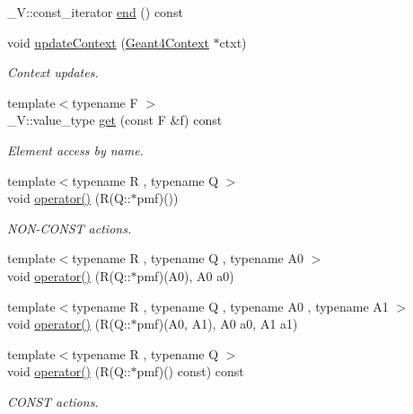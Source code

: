 \begin{DoxyCompactItemize}
\item 
\+\_\+\+V\+::const\+\_\+iterator \hyperlink{class_d_d4hep_1_1_simulation_1_1_geant4_action_1_1_actors_ad19506200e952a7953b94c1d2149f49f}{end} () const
\item 
void \hyperlink{class_d_d4hep_1_1_simulation_1_1_geant4_action_1_1_actors_aadb2c770ac471bc278d2fc9a1cc719d3}{update\+Context} (\hyperlink{class_d_d4hep_1_1_simulation_1_1_geant4_context}{Geant4\+Context} $\ast$ctxt)
\begin{DoxyCompactList}\small\item\em Context updates. \end{DoxyCompactList}\item 
{\footnotesize template$<$typename F $>$ }\\\+\_\+\+V\+::value\+\_\+type \hyperlink{class_d_d4hep_1_1_simulation_1_1_geant4_action_1_1_actors_addafc08601d080959bc0c93bc3318e1a}{get} (const F \&f) const
\begin{DoxyCompactList}\small\item\em Element access by name. \end{DoxyCompactList}\item 
{\footnotesize template$<$typename R , typename Q $>$ }\\void \hyperlink{class_d_d4hep_1_1_simulation_1_1_geant4_action_1_1_actors_aa8cac14e649580acf65f8a1c0392e6e3}{operator()} (R(Q\+::$\ast$pmf)())
\begin{DoxyCompactList}\small\item\em N\+O\+N-\/\+C\+O\+N\+ST actions. \end{DoxyCompactList}\item 
{\footnotesize template$<$typename R , typename Q , typename A0 $>$ }\\void \hyperlink{class_d_d4hep_1_1_simulation_1_1_geant4_action_1_1_actors_a8633bd70a1557d0e6791f2be4a5680e4}{operator()} (R(Q\+::$\ast$pmf)(A0), A0 a0)
\item 
{\footnotesize template$<$typename R , typename Q , typename A0 , typename A1 $>$ }\\void \hyperlink{class_d_d4hep_1_1_simulation_1_1_geant4_action_1_1_actors_a173fec5bb570e095bee2001ef38909b1}{operator()} (R(Q\+::$\ast$pmf)(A0, A1), A0 a0, A1 a1)
\item 
{\footnotesize template$<$typename R , typename Q $>$ }\\void \hyperlink{class_d_d4hep_1_1_simulation_1_1_geant4_action_1_1_actors_a558fcf4dc925660c9946011dff801c99}{operator()} (R(Q\+::$\ast$pmf)() const) const
\begin{DoxyCompactList}\small\item\em C\+O\+N\+ST actions. \end{DoxyCompactList}\item 

\end{DoxyCompactItemize}
